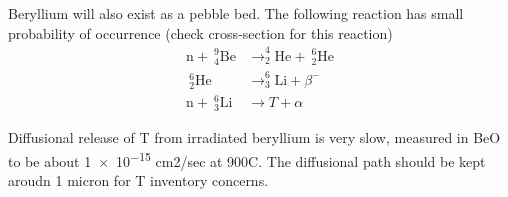 \documentclass[11pt]{report} %
\begin{document}
Beryllium will also exist as a pebble bed. The following reaction has small probability of occurrence (check cross-section for this reaction)
\begin{align}
\mathrm{n} + ~^9_4\mathrm{Be} &\xrightarrow ~ ^4_2\mathrm{He} +~^6_2\mathrm{He}\\
~^6_2\mathrm{He} &\xrightarrow ~ ^6_3\mathrm{Li} + \beta^-\\
\mathrm{n} + ~^6_3\mathrm{Li} &\xrightarrow ~ T + \alpha
\end{align}

Diffusional release of T from irradiated beryllium is very slow, measured in BeO to be about \num{1e-15} cm2/sec at 900C. The diffusional path should be kept aroudn 1 micron for T inventory concerns.
\end{document}
